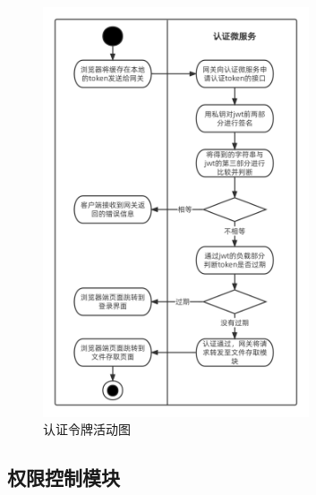 \begin{figure}[htb]
    \centering
    \includegraphics[width=0.7\textwidth]{my_figures/chapter4/认证令牌活动图.png}
    \caption{认证令牌活动图}
    \label{fig:认证令牌活动图}
\end{figure}

\subsection{权限控制模块}


